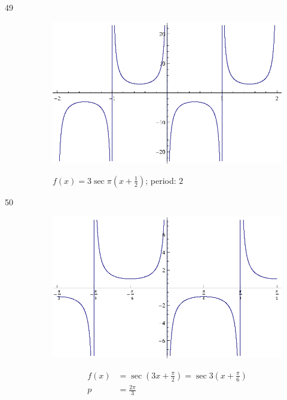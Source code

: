 \documentclass{exam}
\begin{document}
\begin{description}
      \item[49]
        \begin{figure}[H]
          \centering
          \includegraphics[scale=0.9]{exercise49.eps}

          $f(x) = 3 \sec \pi \left( x + \frac{1}{2} \right)$; period: $2$
        \end{figure}

      \item[50]  
        \begin{figure}[H]
          \centering
          \includegraphics[scale=0.9]{exercise50.eps}

          \begin{align*}
            f(x) & = \sec \left( 3x + \frac{\pi}{2} \right) = \sec 3 \left( x + \frac{\pi}{6} \right) \\
            p    & = \frac{2 \pi}{3} \\
          \end{align*}
        \end{figure}


\end{description}
\end{document}

